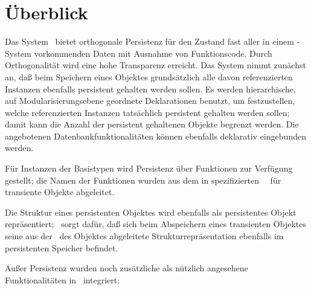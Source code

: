 \section{\"{U}berblick}%
%
Das System \plob\ bietet orthogonale Persistenz f\"{u}r den Zustand fast
aller in einem
\cl-System vorkommenden Daten mit Ausnahme von Funktionscode. Durch
Orthogonalit\"{a}t wird eine hohe Transparenz erreicht. Das System nimmt
zun\"{a}chst an, da\ss{} beim Speichern eines Objektes grunds\"{a}tzlich alle
davon referenzierten Instanzen ebenfalls persistent gehalten werden
sollen. Es werden hierarchische, auf Modularisierungsebene geordnete
Deklarationen benutzt, um festzustellen, welche referenzierten
Instanzen tats\"{a}chlich persistent gehalten werden sollen; damit kann
die Anzahl der persistent gehaltenen Objekte begrenzt werden. Die
angebotenen Datenbankfunktionalit\"{a}ten k\"{o}n\-nen ebenfalls deklarativ
eingebunden werden.
%
\par{}F\"{u}r Instanzen der Basistypen wird Persistenz \"{u}ber Funktionen
zur Verf\"{u}gung gestellt; die  Namen der Funktionen wurden aus dem in
\cite{bib:st90} spezifizierten \cl\ \std\ f\"{u}r transiente Objekte
abgeleitet.
%
\par{}Die Struktur eines persistenten Objektes wird ebenfalls als
persistentes Objekt repr\"{a}sentiert; \plob\ sorgt daf\"{u}r, da\ss{} sich
beim Abspeichern eines transienten Objektes seine aus der \cls\ des
Objektes abgeleitete Strukturrepr\"{a}sentation ebenfalls im persistenten
Speicher befindet.
%
\par{}Au\ss{}er Persistenz wurden noch zu\-s\"{a}tz\-li\-che als n\"{u}tzlich
angesehene Funktionalit\"{a}ten in \plob\ integriert:
